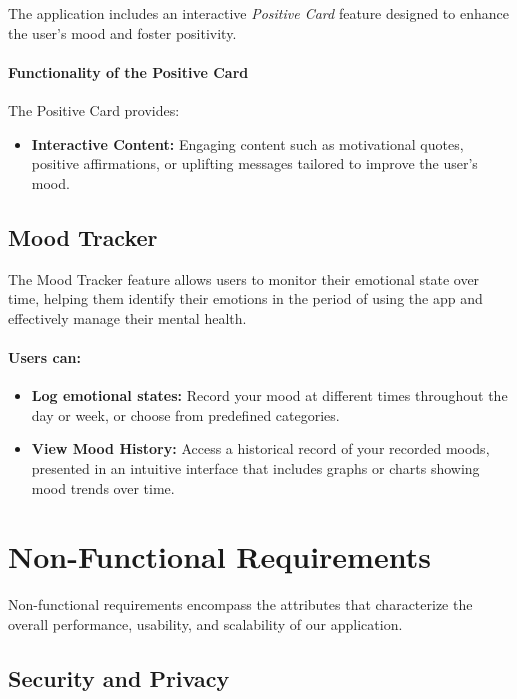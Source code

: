 The application includes an interactive \textit{Positive Card} feature designed to enhance the user's mood and foster positivity.

\paragraph{Functionality of the Positive Card}

The Positive Card provides:

\begin{itemize}
    \item \textbf{Interactive Content:} Engaging content such as motivational quotes, positive affirmations, or uplifting messages tailored to improve the user's mood.

\end{itemize}

\subsection{Mood Tracker}

The Mood Tracker feature allows users to monitor their emotional state over time, helping them identify their emotions in the period of using the app and effectively manage their mental health.

\paragraph{Users can:}

\begin{itemize}
 \item \textbf{Log emotional states:} Record your mood at different times throughout the day or week, or choose from predefined categories.
 \item \textbf{View Mood History:} Access a historical record of your recorded moods, presented in an intuitive interface that includes graphs or charts showing mood trends over time.

\end{itemize}


\section{Non-Functional Requirements}
Non-functional requirements encompass the attributes that characterize the overall performance, usability, and scalability of our application.

\subsection{Security and Privacy}

